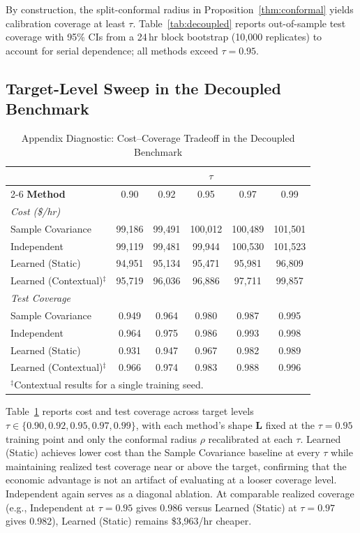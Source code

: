 \documentclass[11pt]{article}
\newcommand{\bL}{\bm{L}}
\theoremstyle{definition}
\begin{document}
By construction, the split-conformal radius in Proposition~\ref{thm:conformal} yields calibration coverage at least $\tau$. Table~\ref{tab:decoupled} reports out-of-sample test coverage with 95\% CIs from a 24\,hr block bootstrap (10{,}000 replicates) to account for serial dependence; all methods exceed $\tau = 0.95$.

\subsection{Target-Level Sweep in the Decoupled Benchmark}

\begin{table}[!t]
\caption{Appendix Diagnostic: Cost--Coverage Tradeoff in the Decoupled Benchmark}
\label{tab:tau-sweep}
\centering
\begin{tabular}{lccccc}
\toprule
& \multicolumn{5}{c}{$\tau$} \\
\cmidrule(lr){2-6}
\textbf{Method} & 0.90 & 0.92 & 0.95 & 0.97 & 0.99 \\
\midrule
\multicolumn{6}{l}{\textit{Cost (\$/hr)}} \\
Sample Covariance & 99{,}186 & 99{,}491 & 100{,}012 & 100{,}489 & 101{,}501 \\
Independent & 99{,}119 & 99{,}481 & 99{,}944 & 100{,}530 & 101{,}523 \\
Learned (Static) & 94{,}951 & 95{,}134 & 95{,}471 & 95{,}981 & 96{,}809 \\
Learned (Contextual)$^\ddagger$ & 95{,}719 & 96{,}036 & 96{,}886 & 97{,}711 & 99{,}857 \\
\midrule
\multicolumn{6}{l}{\textit{Test Coverage}} \\
Sample Covariance & 0.949 & 0.964 & 0.980 & 0.987 & 0.995 \\
Independent & 0.964 & 0.975 & 0.986 & 0.993 & 0.998 \\
Learned (Static) & 0.931 & 0.947 & 0.967 & 0.982 & 0.989 \\
Learned (Contextual)$^\ddagger$ & 0.966 & 0.974 & 0.983 & 0.988 & 0.996 \\
\bottomrule
\multicolumn{6}{l}{\footnotesize $^\ddagger$Contextual results for a single training seed.}
\end{tabular}
\end{table}

Table~\ref{tab:tau-sweep} reports cost and test coverage across target levels $\tau \in \{0.90, 0.92, 0.95, 0.97, 0.99\}$, with each method's shape $\bL$ fixed at the $\tau = 0.95$ training point and only the conformal radius $\rho$ recalibrated at each $\tau$. Learned (Static) achieves lower cost than the Sample Covariance baseline at every $\tau$ while maintaining realized test coverage near or above the target, confirming that the economic advantage is not an artifact of evaluating at a looser coverage level. Independent again serves as a diagonal ablation. At comparable realized coverage (e.g., Independent at $\tau = 0.95$ gives 0.986 versus Learned (Static) at $\tau = 0.97$ gives 0.982), Learned (Static) remains \$3{,}963/hr cheaper.
\end{document}
